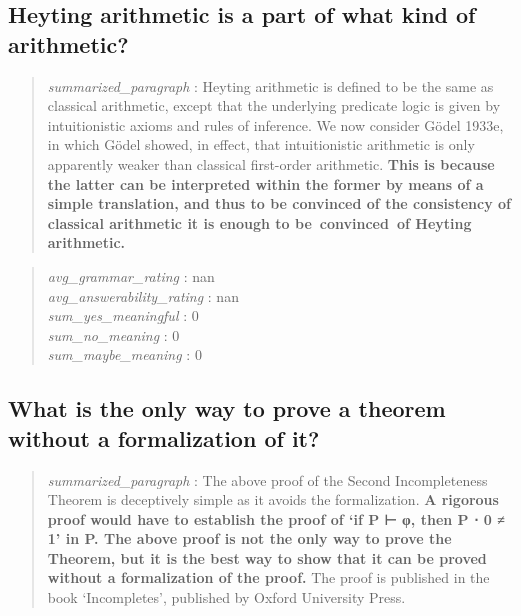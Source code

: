 \hypertarget{heyting-arithmetic-is-a-part-of-what-kind-of-arithmetic}{%
\subsection{Heyting arithmetic is a part of what kind of
arithmetic?}\label{heyting-arithmetic-is-a-part-of-what-kind-of-arithmetic}}

\begin{quote}
\emph{summarized\_paragraph} : Heyting arithmetic is defined to be the
same as classical arithmetic, except that the underlying predicate logic
is given by intuitionistic axioms and rules of inference. We now
consider Gödel 1933e, in which Gödel showed, in effect, that
intuitionistic arithmetic is only apparently weaker than classical
first-order arithmetic. \textbf{This is because the latter can be
interpreted within the former by means of a simple translation, and thus
to be convinced of the consistency of classical arithmetic it is enough
to be~convinced~of Heyting arithmetic.}
\end{quote}

\begin{quote}
\emph{avg\_grammar\_rating} : nan\\
\emph{avg\_answerability\_rating} : nan\\
\emph{sum\_yes\_meaningful} : 0\\
\emph{sum\_no\_meaning} : 0\\
\emph{sum\_maybe\_meaning} : 0
\end{quote}

\hypertarget{what-is-the-only-way-to-prove-a-theorem-without-a-formalization-of-it}{%
\subsection{What is the only way to prove a theorem without a
formalization of
it?}\label{what-is-the-only-way-to-prove-a-theorem-without-a-formalization-of-it}}

\begin{quote}
\emph{summarized\_paragraph} : The above proof of the Second
Incompleteness Theorem is deceptively simple as it avoids the
formalization. \textbf{A rigorous proof would have to establish the
proof of `if P ⊢ φ, then P ⋅ 0 ≠ 1' in P. The above proof is not the
only way to prove the Theorem, but it is the best way to show that it
can be proved without a formalization of the proof.} The proof is
published in the book `Incompletes', published by Oxford University
Press.
\end{quote}

